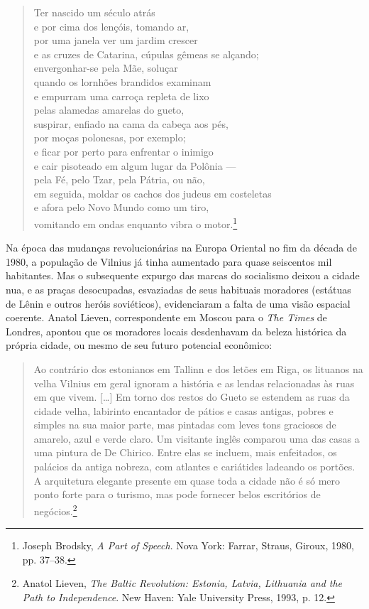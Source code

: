 %
\begin{verse}
Ter nascido um século atrás\\
e por cima dos lençóis, tomando ar,\\
por uma janela ver um jardim crescer\\
e as cruzes de Catarina, cúpulas gêmeas se alçando;\\
envergonhar-se pela Mãe, soluçar\\
quando os lornhões brandidos examinam\\
e empurram uma carroça repleta de lixo\\
pelas alamedas amarelas do gueto,\\
suspirar, enfiado na cama da cabeça aos pés,\\
por moças polonesas, por exemplo;\\
e ficar por perto para enfrentar o inimigo\\
e cair pisoteado em algum lugar da Polônia ---\\
pela Fé, pelo Tzar, pela Pátria, ou não,\\
em seguida, moldar os cachos dos judeus em \qb{}costeletas\\
e afora pelo Novo Mundo como um tiro,\\
vomitando em ondas enquanto vibra o motor.\footnote{Joseph Brodsky, \textit{A Part of Speech}. Nova York: Farrar, Straus, Giroux, 1980, pp. 37--38.}
\end{verse}

Na época das mudanças revolucionárias na Europa Oriental no fim da
década de 1980, a população de Vilnius já tinha aumentado para quase
seiscentos mil habitantes. Mas o subsequente expurgo das marcas do
socialismo deixou a cidade nua, e as praças desocupadas, esvaziadas de
seus habituais moradores (estátuas de Lênin e outros heróis
soviéticos), evidenciaram a falta de uma visão espacial coerente. Anatol
Lieven, correspondente em Moscou para o \textit{The Times} de Londres,
apontou que os moradores locais desdenhavam da beleza histórica da
própria cidade, ou mesmo de seu futuro potencial econômico:

\begin{quote}
Ao contrário dos estonianos em Tallinn e dos letões em Riga, os lituanos
na velha Vilnius em geral ignoram a história e as lendas relacionadas às
ruas em que vivem. [\ldots{}] Em torno dos restos do Gueto se estendem as
ruas da cidade velha, labirinto encantador de pátios e casas antigas,
pobres e simples na sua maior parte, mas pintadas com leves tons
graciosos de amarelo, azul e verde claro. Um visitante inglês comparou
uma das casas a uma pintura de De Chirico. Entre elas se incluem, mais
enfeitados, os palácios da antiga nobreza, com atlantes e cariátides
ladeando os portões. A arquitetura elegante presente em quase toda a
cidade não é só mero ponto forte para o turismo, mas pode fornecer belos
escritórios de negócios.\footnote{Anatol Lieven, \textit{The Baltic Revolution: Estonia, Latvia, Lithuania and the Path to Independence}. New Haven: Yale University Press, 1993, p. 12.} \end{quote}

